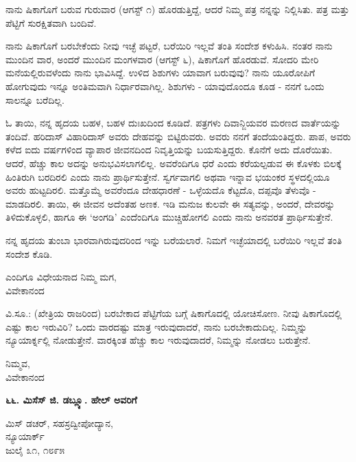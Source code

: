 ನಾನು ಷಿಕಾಗೊಗೆ ಬರುವ ಗುರುವಾರ (ಆಗಸ್ಟ್ ೧) ಹೊರಡುತ್ತಿದ್ದೆ, ಆದರೆ ನಿಮ್ಮ ಪತ್ರ ನನ್ನನ್ನು ನಿಲ್ಲಿಸಿತು. ಪತ್ರ ಮತ್ತು ಪೆಟ್ಟಿಗೆ ಸುರಕ್ಷಿತವಾಗಿ ಬಂದಿವೆ.

ನಾನು ಷಿಕಾಗೊಗೆ ಬರಬೇಕೆಂದು ನೀವು ಇಚ್ಛೆ ಪಟ್ಟರೆ, ಬರೆಯಿರಿ ಇಲ್ಲವೆ ತಂತಿ ಸಂದೇಶ ಕಳುಹಿಸಿ. ನಂತರ ನಾನು ಮುಂದಿನ ವಾರ, ಅಂದರೆ ಮುಂದಿನ ಮಂಗಳವಾರ (ಆಗಸ್ಟ್ ೬), ಷಿಕಾಗೊಗೆ ಹೊರಡುವೆ. ಸೋದರಿ ಮೇರಿ ಮನೆಯಲ್ಲಿರುವಳೆಂದು ನಾನು ಭಾವಿಸಿದ್ದೆ. ಉಳಿದ ಶಿಶುಗಳು ಯಾವಾಗ ಬರುವುವು? ನಾನು ಯೂರೋಪಿಗೆ ಹೋಗುವುದು ಇನ್ನೂ ಅಂತಿಮವಾಗಿ ನಿರ್ಧಾರವಾಗಿಲ್ಲ. ಶಿಶುಗಳು - ಯಾವುದೊಂದೂ ಕೂಡ - ನನಗೆ ಒಂದು ಸಾಲನ್ನೂ ಬರೆದಿಲ್ಲ.

ಓ ತಾಯಿ, ನನ್ನ ಹೃದಯ ಬಹಳ, ಬಹಳ ದುಃಖದಿಂದ ಕೂಡಿದೆ. ಪತ್ರಗಳು ದಿವಾನ್ಜಿಯವರ ಮರಣದ ವಾರ್ತೆಯನ್ನು ತಂದಿವೆ. ಹರಿದಾಸ್ ವಿಹಾರಿದಾಸ್ ಅವರು ದೇಹವನ್ನು ಬಿಟ್ಟಿರುವರು. ಅವರು ನನಗೆ ತಂದೆಯಂತಿದ್ದರು. ಪಾಪ, ಅವರು ಕಳೆದ ಐದು ವರ್ಷಗಳಿಂದ ವ್ಯಾಪಾರ ಜೀವನದಿಂದ ನಿವೃತ್ತಿಯನ್ನು ಬಯಸುತ್ತಿದ್ದರು. ಕೊನೆಗೆ ಅದು ದೊರೆಯಿತು. ಆದರೆ, ಹೆಚ್ಚು ಕಾಲ ಅದನ್ನು ಅನುಭವಿಸಲಾಗಲಿಲ್ಲ. ಅವರೆಂದಿಗೂ ಧರೆ ಎಂದು ಕರೆಯಲ್ಪಡುವ ಈ ಕೊಳಕು ಬಿಲಕ್ಕೆ ಹಿಂತಿರುಗಿ ಬರದಿರಲಿ ಎಂದು ನಾನು ಪ್ರಾರ್ಥಿಸುತ್ತೇನೆ. ಸ್ವರ್ಗವಾಗಲಿ ಅಥವಾ ಇನ್ನಾವ ಭಯಂಕರ ಸ್ಥಳದಲ್ಲಿಯೂ ಅವರು ಹುಟ್ಟದಿರಲಿ. ಮತ್ತೊಮ್ಮೆ ಅವರೆಂದೂ ದೇಹಧಾರಣೆ - ಒಳ್ಳೆಯದೊ ಕೆಟ್ಟದೊ, ದಪ್ಪವೊ ತೆಳುವೊ - ಮಾಡದಿರಲಿ. ತಾಯಿ, ಈ ಜೀವನ ಅದೆಂತಹ ಅಣಕ. ಇಡಿ ಮನುಜ ಕುಲವೇ ಈ ಸತ್ಯವನ್ನು, ಅಂದರೆ, ದೇವರನ್ನು ತಿಳಿದುಕೊಳ್ಳಲಿ, ಹಾಗೂ ಈ ‘ಅಂಗಡಿ’ ಎಂದೆಂದಿಗೂ ಮುಚ್ಚಿಹೋಗಲಿ ಎಂದು ನಾನು ಅನವರತ ಪ್ರಾರ್ಥಿಸುತ್ತೇನೆ.

ನನ್ನ ಹೃದಯ ತುಂಬಾ ಭಾರವಾಗಿರುವುದರಿಂದ ಇನ್ನು ಬರೆಯಲಾರೆ. ನಿಮಗೆ ಇಚ್ಛೆಯಾದಲ್ಲಿ ಬರೆಯಿರಿ ಇಲ್ಲವೆ ತಂತಿ ಸಂದೇಶ ಕೊಡಿ.

\begin{flushright}
ಎಂದಿಗೂ ವಿಧೇಯನಾದ ನಿಮ್ಮ ಮಗ,\\ವಿವೇಕಾನಂದ
\end{flushright}

ವಿ.ಸೂ.: (ಖೇತ್ರಿಯ ರಾಜರಿಂದ) ಬರಬೇಕಾದ ಪೆಟ್ಟಿಗೆಯ ಬಗ್ಗೆ ಷಿಕಾಗೊದಲ್ಲಿ ಯೋಚಿಸೋಣ. ನೀವು ಷಿಕಾಗೊದಲ್ಲಿ ಎಷ್ಟು ಕಾಲ ಇರುವಿರಿ? ಒಂದು ವಾರದಷ್ಟು ಮಾತ್ರ ಇರುವುದಾದರೆ, ನಾನು ಬರಬೇಕಾದುದಿಲ್ಲ. ನಿಮ್ಮನ್ನು ನ್ಯೂಯಾರ್ಕ್ನಲ್ಲಿ ನೋಡುತ್ತೇನೆ. ವಾರಕ್ಕಿಂತ ಹೆಚ್ಚು ಕಾಲ ಇರುವುದಾದರೆ, ನಿಮ್ಮನ್ನು ನೋಡಲು ಬರುತ್ತೇನೆ.

\begin{flushright}
ನಿಮ್ಮವ,\\ವಿವೇಕಾನಂದ
\end{flushright}

\begin{center}
\textbf{೬೬. ಮಿಸೆಸ್ ಜಿ. ಡಬ್ಲ್ಯೂ. ಹೇಲ್ ಅವರಿಗೆ}
\end{center}

\begin{flushright}
 ಮಿಸ್ ಡಚರ್, ಸಹಸ್ರದ್ವೀಪೋದ್ಯಾನ,\\ನ್ಯೂಯಾರ್ಕ್\\ಜುಲೈ ೩೧, ೧೮೯೫
\end{flushright}

